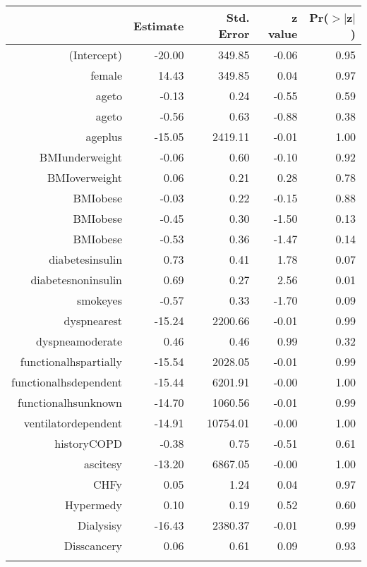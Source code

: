 \bigskip\bigskip
\centering
\begin{tabular}{rrrrr}
  \hline
 & Estimate & Std. Error & z value & Pr($>$$|$z$|$) \\ 
  \hline
(Intercept) & -20.00 & 349.85 & -0.06 & 0.95 \\ 
  female & 14.43 & 349.85 & 0.04 & 0.97 \\ 
  age\-65\-to\-74 & -0.13 & 0.24 & -0.55 & 0.59 \\ 
  age\-75\-to\-84 & -0.56 & 0.63 & -0.88 & 0.38 \\ 
  age\-85\-plus & -15.05 & 2419.11 & -0.01 & 1.00 \\ 
  BMI\-underweight & -0.06 & 0.60 & -0.10 & 0.92 \\ 
  BMI\-overweight & 0.06 & 0.21 & 0.28 & 0.78 \\ 
  BMI\-obese\-1 & -0.03 & 0.22 & -0.15 & 0.88 \\ 
  BMI\-obese\-2 & -0.45 & 0.30 & -1.50 & 0.13 \\ 
  BMI\-obese\-3 & -0.53 & 0.36 & -1.47 & 0.14 \\ 
  diabetes\-insulin & 0.73 & 0.41 & 1.78 & 0.07 \\ 
  diabetes\-noninsulin & 0.69 & 0.27 & 2.56 & 0.01 \\ 
  smoke\-yes & -0.57 & 0.33 & -1.70 & 0.09 \\ 
  dyspnea\-rest & -15.24 & 2200.66 & -0.01 & 0.99 \\ 
  dyspnea\-moderate & 0.46 & 0.46 & 0.99 & 0.32 \\ 
  functional\-hs\-partially & -15.54 & 2028.05 & -0.01 & 0.99 \\ 
  functional\-hs\-dependent & -15.44 & 6201.91 & -0.00 & 1.00 \\ 
  functional\-hs\-unknown & -14.70 & 1060.56 & -0.01 & 0.99 \\ 
  ventilator\-dependent & -14.91 & 10754.01 & -0.00 & 1.00 \\ 
  history\-COPD & -0.38 & 0.75 & -0.51 & 0.61 \\ 
  ascites\-y & -13.20 & 6867.05 & -0.00 & 1.00 \\ 
  CHF\-y & 0.05 & 1.24 & 0.04 & 0.97 \\ 
  Hyper\-med\-y & 0.10 & 0.19 & 0.52 & 0.60 \\ 
  Dialysis\-y & -16.43 & 2380.37 & -0.01 & 0.99 \\ 
  Diss\-cancer\-y & 0.06 & 0.61 & 0.09 & 0.93 \\ 
$$
\end{tabular}
